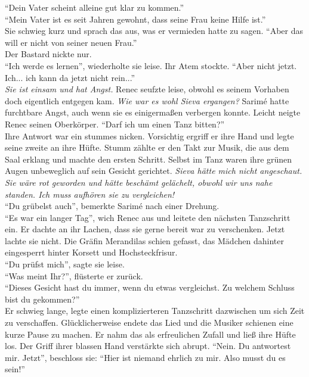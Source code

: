 ``Dein Vater scheint alleine gut klar zu kommen.''\\
``Mein Vater ist es seit Jahren gewohnt, dass seine Frau keine Hilfe ist.''\\
Sie schwieg kurz und sprach das aus, was er vermieden hatte zu sagen. ``Aber das will er nicht von 
seiner neuen Frau.''\\
Der Bastard nickte nur.\\
``Ich werde es lernen'', wiederholte sie leise. Ihr Atem stockte. ``Aber nicht jetzt. Ich... ich 
kann da jetzt nicht rein...''\\
\textit{Sie ist einsam und hat Angst.} Renec seufzte leise, obwohl es seinem Vorhaben doch 
eigentlich entgegen kam. \textit{Wie war es wohl Sieva ergangen?} Sarimé hatte furchtbare Angst, 
auch wenn sie es einigermaßen verbergen konnte. Leicht neigte Renec seinen Oberkörper. ``Darf ich um 
einen Tanz bitten?''\\
Ihre Antwort war ein stummes nicken. Vorsichtig ergriff er ihre Hand und legte seine zweite an ihre 
Hüfte. Stumm zählte er den Takt zur Musik, die aus dem Saal erklang und machte den ersten Schritt. 
Selbst im Tanz waren ihre grünen Augen unbeweglich auf sein Gesicht gerichtet. \textit{Sieva 
hätte mich nicht angeschaut. Sie wäre rot geworden und hätte beschämt gelächelt, obwohl wir uns 
nahe standen. Ich muss aufhören sie zu vergleichen!}\\
``Du grübelst auch'', bemerkte Sarimé nach einer Drehung.\\
``Es war ein langer Tag'', wich Renec aus und leitete den nächsten Tanzschritt ein. Er dachte an 
ihr Lachen, dass sie gerne bereit war zu verschenken. Jetzt lachte sie nicht. Die Gräfin Merandilas 
schien gefasst, das Mädchen dahinter eingesperrt hinter Korsett und Hochsteckfrisur. \\
``Du prüfst mich'', sagte sie leise.\\
``Was meint Ihr?'', flüsterte er zurück.\\
``Dieses Gesicht hast du immer, wenn du etwas vergleichst. Zu welchem Schluss bist du gekommen?''\\
Er schwieg lange, legte einen komplizierteren Tanzschritt dazwischen um sich Zeit zu verschaffen. 
Glücklicherweise endete das Lied und die Musiker schienen eine kurze Pause zu machen. Er nahm das 
als erfreulichen Zufall und ließ ihre Hüfte los. Der Griff ihrer blassen Hand verstärkte sich 
abrupt. ``Nein. Du antwortest mir. Jetzt'', beschloss sie: ``Hier ist niemand ehrlich zu mir. Also 
musst du es sein!''\\
